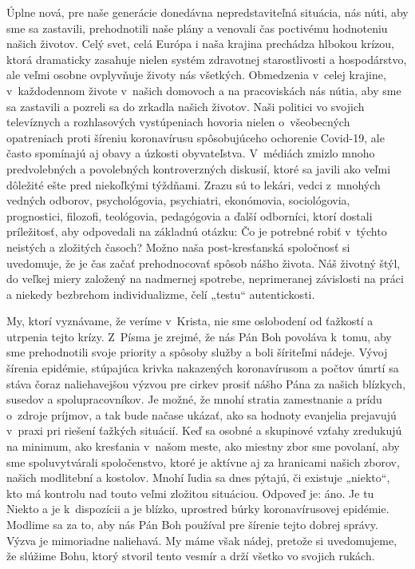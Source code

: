 


Úplne nová, pre naše generácie donedávna nepredstaviteľná situácia, nás núti, aby sme sa zastavili, prehodnotili naše plány a venovali čas poctivému hodnoteniu našich životov. Celý svet, celá Európa i naša krajina prechádza hlbokou krízou, ktorá dramaticky zasahuje nielen systém zdravotnej starostlivosti a hospodárstvo, ale veľmi osobne ovplyvňuje životy nás všetkých. Obmedzenia v~celej krajine, v~každodennom živote v~našich domovoch a na pracoviskách nás nútia, aby sme sa zastavili a pozreli sa do zrkadla našich životov. Naši politici vo svojich televíznych a rozhlasových vystúpeniach hovoria nielen o~všeobecných opatreniach proti šíreniu koronavírusu spôsobujúceho ochorenie Covid-19, ale často spomínajú aj obavy a úzkosti obyvateľstva. V~médiách zmizlo mnoho predvolebných a povolebných kontroverzných diskusií, ktoré sa javili ako veľmi dôležité ešte pred niekoľkými týždňami. Zrazu sú to lekári, vedci z~mnohých vedných odborov, psychológovia, psychiatri, ekonómovia, sociológovia, prognostici, filozofi, teológovia, pedagógovia a ďalší odborníci, ktorí dostali príležitosť, aby odpovedali na základnú otázku: Čo je potrebné robiť v~týchto neistých a zložitých časoch? Možno naša post-kresťanská spoločnosť si uvedomuje, že je čas začať prehodnocovať spôsob nášho života. Náš životný štýl, do veľkej miery založený na nadmernej spotrebe, neprimeranej závislosti na práci a niekedy bezbrehom individualizme, čelí „testu“ autentickosti.

My, ktorí vyznávame, že veríme v~Krista, nie sme oslobodení od ťažkostí a utrpenia tejto krízy. Z~Písma je zrejmé, že nás Pán Boh povoláva k~tomu, aby sme prehodnotili svoje priority a spôsoby služby a boli šíriteľmi nádeje. Vývoj šírenia epidémie, stúpajúca krivka nakazených koronavírusom a počtov úmrtí sa stáva čoraz naliehavejšou výzvou pre cirkev prosiť nášho Pána za našich blízkych, susedov a spolupracovníkov. Je možné, že mnohí stratia zamestnanie a prídu o~zdroje príjmov, a tak bude načase ukázať, ako sa hodnoty evanjelia prejavujú v~praxi pri riešení ťažkých situácií. Keď sa osobné a skupinové vzťahy zredukujú na minimum, ako kresťania v~našom meste, ako miestny zbor sme povolaní, aby sme spoluvytvárali spoločenstvo, ktoré je aktívne aj za hranicami našich zborov, našich modlitební a kostolov. Mnohí ľudia sa dnes pýtajú, či existuje „niekto“, kto má kontrolu nad touto veľmi zložitou situáciou. Odpoveď je: áno. Je tu Niekto a je k~dispozícii a je blízko, uprostred búrky koronavírusovej epidémie. Modlime sa za to, aby nás Pán Boh používal pre šírenie tejto dobrej správy. Výzva je mimoriadne naliehavá. My máme však nádej, pretože si uvedomujeme, že slúžime Bohu, ktorý stvoril tento vesmír a drží všetko vo svojich rukách.


